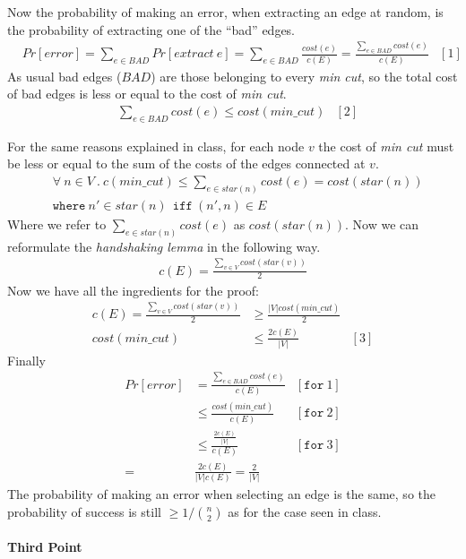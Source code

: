 \documentclass[a4paper]{article}
\begin{document}
Now the probability of making an error, when extracting an edge at random, is the probability of extracting one of the ``bad'' edges.
\begin{align*}
&Pr[error] = \sum_{e \in BAD} Pr[extract\ e] = \sum_{e \in BAD} \frac{cost(e)}{c(E)} = \frac{\sum_{e \in BAD} cost(e)}{c(E)} &[1]
\end{align*}
As usual bad edges ($BAD$) are those belonging to every \textit{min cut}, so the total cost of bad edges is less or equal to the cost of \textit{min cut}.
\begin{align*}
&\sum_{e \in BAD} cost(e) \leq {cost(min\_cut)} &[2]
\end{align*}

For the same reasons explained in class, for each node $v$ the cost of \textit{min cut} must be less or equal to the sum of the costs of the edges connected at $v$.
\begin{align*}
&\forall\ n \in V\ .\ c(min\_cut) \leq \sum_{e \in star(n)} cost(e) = cost(star(n))\\
&\texttt{where} \ n' \in star(n)\ \ \texttt{iff}\ (n', n) \in E
\end{align*}
Where we refer to $\sum_{e \in star(n)} cost(e)$ as $cost(star(n))$. 
Now we can reformulate the \textit{handshaking lemma} in the following way.
\begin{align*}
c(E) = \frac{\sum_{v \in V} cost(star(v))}{2}
\end{align*}
Now we have all the ingredients for the proof:
\begin{align*}
c(E) = \frac{\sum_{v \in V} cost(star(v))}{2} &\geq \frac{\vert V \vert cost(min\_cut)}{2}\\
cost(min\_cut) &\leq \frac{2c(E)}{\vert V \vert} &[3]
\end{align*}
Finally
\begin{align*}
Pr[error] &= \frac{\sum_{e \in BAD} cost(e)}{c(E)} &[\texttt{for}\ 1]\\
&\leq \frac{cost(min\_cut)}{c(E)} &[\texttt{for}\ 2]\\
&\leq \frac{\frac{2c(E)}{\vert V \vert}}{c(E)} &[\texttt{for}\ 3]\\= 
&\frac{2c(E)}{\vert V \vert c(E)} = \frac{2}{\vert V \vert}
\end{align*}
The probability of making an error when selecting an edge is the same, so the probability of success is still $\geq 1/ \binom{n}{2}$ as for the case seen in class.
\\
\\
\noindent
\textbf{Third Point}
\\
\end{document}
